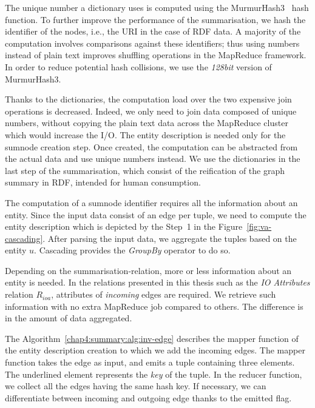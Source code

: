 The unique number a dictionary uses is computed using the MurmurHash3~\cite{murmurhash3-gcode,murmurhash3-blog} hash function. To further improve the performance of the summarisation, we hash the identifier of the nodes, i.e., the URI in the case of RDF data. A majority of the computation involves comparisons against these identifiers; thus using numbers instead of plain text improves shuffling operations in the MapReduce framework. In order to reduce potential hash collisions, we use the \emph{128bit} version of MurmurHash3.

Thanks to the dictionaries, the computation load over the two expensive join operations is decreased. Indeed, we only need to join data composed of unique numbers, without copying the plain text data across the MapReduce cluster which would increase the I/O. The entity description is needed only for the sumnode creation step. Once created, the computation can be abstracted from the actual data and use unique numbers instead. We use the dictionaries in the last step of the summarisation, which consist of the reification of the graph summary in RDF, intended for human consumption.


The computation of a sumnode identifier requires all the information about an entity. Since the input data consist of an edge per tuple, we need to compute the entity description  which is depicted by the Step~1 in the Figure~\ref{fig:va-cascading}. After parsing the input data, we aggregate the tuples based on the entity $u$. Cascading provides the \emph{GroupBy} operator to do so.

Depending on the \gls{summarisation-relation}, more or less information about an entity is needed. In the relations presented in this thesis such as the \emph{IO Attributes} relation $R_{ioa}$, attributes of \emph{incoming} edges are required. We retrieve such information with no extra MapReduce job compared to others. The difference is in the amount of data aggregated.

The Algorithm~\ref{chap4:summary:alg:inv-edge} describes the mapper function of the entity description creation to which we add the incoming edges. The mapper function takes the edge as input, and emits a tuple containing three elements. The underlined element represents the \emph{key} of the tuple. In the reducer function, we collect all the edges having the same hash key. If necessary, we can differentiate between incoming and outgoing edge thanks to the emitted flag.

